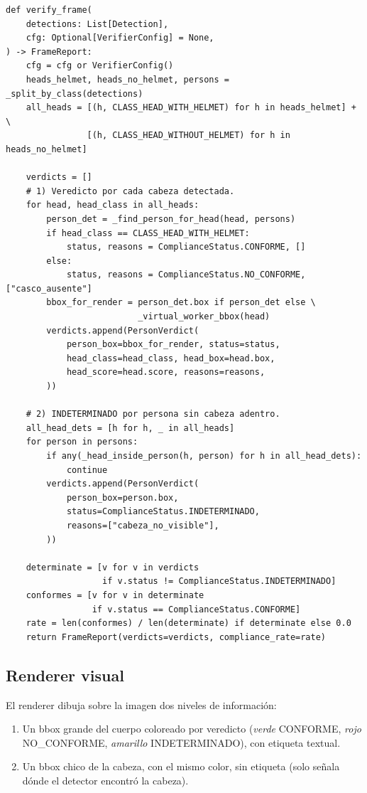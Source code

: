 \documentclass[11pt,a4paper]{article}
\begin{document}
\begin{lstlisting}[caption={Función principal \texttt{verify\_frame()}
del verificador (versión solo-casco).}]
def verify_frame(
    detections: List[Detection],
    cfg: Optional[VerifierConfig] = None,
) -> FrameReport:
    cfg = cfg or VerifierConfig()
    heads_helmet, heads_no_helmet, persons = _split_by_class(detections)
    all_heads = [(h, CLASS_HEAD_WITH_HELMET) for h in heads_helmet] + \
                [(h, CLASS_HEAD_WITHOUT_HELMET) for h in heads_no_helmet]

    verdicts = []
    # 1) Veredicto por cada cabeza detectada.
    for head, head_class in all_heads:
        person_det = _find_person_for_head(head, persons)
        if head_class == CLASS_HEAD_WITH_HELMET:
            status, reasons = ComplianceStatus.CONFORME, []
        else:
            status, reasons = ComplianceStatus.NO_CONFORME, ["casco_ausente"]
        bbox_for_render = person_det.box if person_det else \
                          _virtual_worker_bbox(head)
        verdicts.append(PersonVerdict(
            person_box=bbox_for_render, status=status,
            head_class=head_class, head_box=head.box,
            head_score=head.score, reasons=reasons,
        ))

    # 2) INDETERMINADO por persona sin cabeza adentro.
    all_head_dets = [h for h, _ in all_heads]
    for person in persons:
        if any(_head_inside_person(h, person) for h in all_head_dets):
            continue
        verdicts.append(PersonVerdict(
            person_box=person.box,
            status=ComplianceStatus.INDETERMINADO,
            reasons=["cabeza_no_visible"],
        ))

    determinate = [v for v in verdicts
                   if v.status != ComplianceStatus.INDETERMINADO]
    conformes = [v for v in determinate
                 if v.status == ComplianceStatus.CONFORME]
    rate = len(conformes) / len(determinate) if determinate else 0.0
    return FrameReport(verdicts=verdicts, compliance_rate=rate)
\end{lstlisting}

\subsection{Renderer visual}

El renderer dibuja sobre la imagen dos niveles de información:
\begin{enumerate}[leftmargin=*]
    \item Un bbox grande del cuerpo coloreado por veredicto
    (\textit{verde} CONFORME, \textit{rojo} NO\_CONFORME,
    \textit{amarillo} INDETERMINADO), con etiqueta textual.
    \item Un bbox chico de la cabeza, con el mismo color, sin etiqueta
    (solo señala dónde el detector encontró la cabeza).
\end{enumerate}
\end{document}
